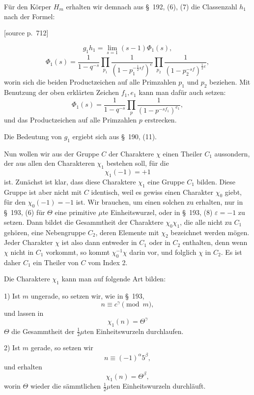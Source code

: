 \documentclass[11pt]{article}
\newcommand{\eps}{\varepsilon}
\newcommand{\srcpage}[1]{\par\medskip\noindent\textsf{[source p.~#1]}\par\smallskip}
\begin{document}
Für den Körper $H_m$ erhalten wir demnach aus \S~192, (6), (7) die Classenzahl $h_1$ nach der Formel:
\srcpage{712}
\begin{equation}
g_1h_1=\lim_{s=1}(s-1)\Phi_1(s),
\tag{2}
\end{equation}
\begin{equation}
\Phi_1(s)=\frac1{1-q^{-s}}\prod_{p_1}\frac1{(1-p_1^{-\frac12sf})^e}\prod_{p_2}\frac1{(1-p_2^{-sf})^{\frac12e}},
\tag{3}
\end{equation}
worin sich die beiden Productzeichen auf alle Primzahlen $p_1$ und $p_2$ beziehen. Mit Benutzung der oben erklärten Zeichen $f_1,e_1$ kann man dafür auch setzen:
\begin{equation}
\Phi_1(s)=\frac1{1-q^{-s}}\prod_p\frac1{(1-p^{-sf_1})^{e_1}},
\tag{4}
\end{equation}
und das Productzeichen auf alle Primzahlen $p$ erstrecken.

Die Bedeutung von $g_1$ ergiebt sich aus \S~190, (11).

Nun wollen wir aus der Gruppe $C$ der Charaktere $\chi$ einen Theiler $C_1$ aussondern, der aus allen den Charakteren $\chi_1$ bestehen soll, für die
\begin{equation}
\chi_1(-1)=+1
\tag{5}
\end{equation}
ist. Zunächst ist klar, dass diese Charaktere $\chi_1$ eine Gruppe $C_1$ bilden. Diese Gruppe ist aber nicht mit $C$ identisch, weil es gewiss einen Charakter $\chi_0$ giebt, für den $\chi_0(-1)=-1$ ist. Wir brauchen, um einen solchen zu erhalten, nur in \S~193, (6) für $\Theta$ eine primitive $\mu$te Einheitswurzel, oder in \S~193, (8) $\eps=-1$ zu setzen. Dann bildet die Gesammtheit der Charaktere $\chi_0\chi_1$, die alle nicht zu $C_1$ gehören, eine Nebengruppe $C_2$, deren Elemente mit $\chi_2$ bezeichnet werden mögen. Jeder Charakter $\chi$ ist also dann entweder in $C_1$ oder in $C_2$ enthalten, denn wenn $\chi$ nicht in $C_1$ vorkommt, so kommt $\chi_0^{-1}\chi$ darin vor, und folglich $\chi$ in $C_2$. Es ist daher $C_1$ ein Theiler von $C$ vom Index 2.

Die Charaktere $\chi_1$ kann man auf folgende Art bilden:

1) Ist $m$ ungerade, so setzen wir, wie in \S~193,
\[
n\equiv c^\gamma\pmod m,
\]
und lassen in
\begin{equation}
\chi_1(n)=\Theta^\gamma
\tag{6}
\end{equation}
$\Theta$ die Gesammtheit der $\frac12\mu$ten Einheitswurzeln durchlaufen.

2) Ist $m$ gerade, so setzen wir
\[
n\equiv(-1)^\alpha5^\beta,
\]
und erhalten
\begin{equation}
\chi_1(n)=\Theta^\beta,
\tag{7}
\end{equation}
worin $\Theta$ wieder die sämmtlichen $\frac12\mu$ten Einheitswurzeln durchläuft.
\end{document}
